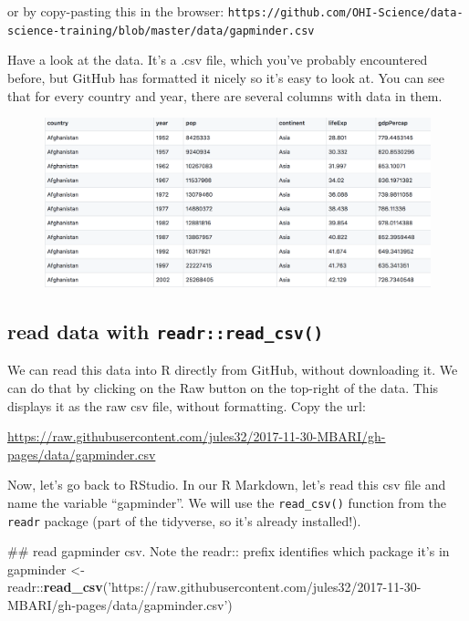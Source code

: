 \documentclass[]{book}
\newenvironment{Shaded}{\begin{snugshade}}{\end{snugshade}}
\newcommand{\KeywordTok}[1]{\textcolor[rgb]{0.13,0.29,0.53}{\textbf{{#1}}}}
\newcommand{\StringTok}[1]{\textcolor[rgb]{0.31,0.60,0.02}{{#1}}}
\newcommand{\NormalTok}[1]{{#1}}
\theoremstyle{definition}
\theoremstyle{definition}
\theoremstyle{definition}
\theoremstyle{remark}
\begin{document}
or by copy-pasting this in the browser:
\texttt{https://github.com/OHI-Science/data-science-training/blob/master/data/gapminder.csv}

Have a look at the data. It's a .csv file, which you've probably
encountered before, but GitHub has formatted it nicely so it's easy to
look at. You can see that for every country and year, there are several
columns with data in them.

\begin{figure}[htbp]
\centering
\includegraphics{img/gapminder_gh.png}
\caption{}
\end{figure}

\subsection{\texorpdfstring{read data with
\texttt{readr::read\_csv()}}{read data with readr::read\_csv()}}\label{read-data-with-readrread_csv}

We can read this data into R directly from GitHub, without downloading
it. We can do that by clicking on the Raw button on the top-right of the
data. This displays it as the raw csv file, without formatting. Copy the
url:

\url{https://raw.githubusercontent.com/jules32/2017-11-30-MBARI/gh-pages/data/gapminder.csv}

Now, let's go back to RStudio. In our R Markdown, let's read this csv
file and name the variable ``gapminder''. We will use the
\texttt{read\_csv()} function from the \texttt{readr} package (part of
the tidyverse, so it's already installed!).

\begin{Shaded}
\begin{Highlighting}[]
\NormalTok{## read gapminder csv. Note the readr:: prefix identifies which package it's in}
\NormalTok{gapminder <-}\StringTok{ }\NormalTok{readr::}\KeywordTok{read_csv}\NormalTok{(}\StringTok{'https://raw.githubusercontent.com/jules32/2017-11-30-MBARI/gh-pages/data/gapminder.csv'}\NormalTok{) }
\end{Highlighting}
\end{Shaded}
\end{document}
